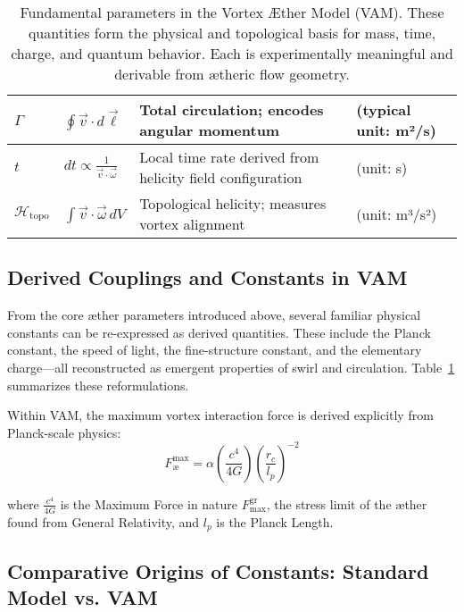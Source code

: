 \begin{table}[H]
\begin{tabular}{|l|l|l|l|}
        $\Gamma$ &
        $\oint \vec{v} \cdot d\vec{\ell}$ &
        Total circulation; encodes angular momentum &
        (typical unit: m²/s) \\
        \hline

        $t$ &
        $dt \propto \frac{1}{\vec{v} \cdot \vec{\omega}}$ &
        Local time rate derived from helicity field configuration &
        (unit: s) \\
        \hline

        $\mathcal{H}_\text{topo}$ &
        $\int \vec{v} \cdot \vec{\omega} \, dV$ &
        Topological helicity; measures vortex alignment &
        (unit: m³/s²) \\
        \hline
    \end{tabular}
    \caption{Fundamental parameters in the Vortex Æther Model (VAM). These quantities form the physical and topological basis for mass, time, charge, and quantum behavior. Each is experimentally meaningful and derivable from ætheric flow geometry.}
    \label{tab:VAM_master_table}
\end{table}


\subsection*{Derived Couplings and Constants in VAM}
From the core æther parameters introduced above, several familiar physical constants can be re-expressed as derived quantities. These include the Planck constant, the speed of light, the fine-structure constant, and the elementary charge—all reconstructed as emergent properties of swirl and circulation. Table~\ref{tab:VAM_master_table} summarizes these reformulations.

Within VAM, the maximum vortex interaction force is derived explicitly from Planck-scale physics:
\begin{equation}
    F^{\text{max}}_{\text{\ae}} = \alpha \left(\frac{c^4}{4G}\right)  \left(\frac{r_c}{l_p}\right)^{-2}\label{eq:FmaxVAMfromGR}
\end{equation}

where $\frac{c^4}{4G}$ is the Maximum Force in nature $F^{\text{gr}}_\text{max}$, the stress limit of the æther found from General Relativity, and $l_p$ is the Planck Length.


\subsection*{Comparative Origins of Constants: Standard Model vs. VAM}

